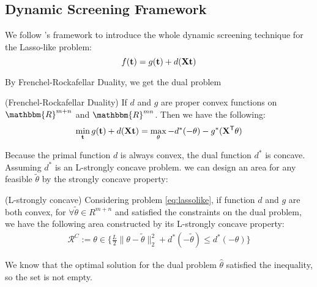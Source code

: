 \subsection{Dynamic Screening Framework}

We follow \citep{NEURIPS2021_7b5b23f4}'s framework to introduce the whole dynamic screening technique for the Lasso-like problem:
\begin{equation}
\label{eq:lassolike}
f(\mathbf t) = g(\mathbf t) + d(\mathbf{X} \mathbf t)
\end{equation}

By Frenchel-Rockafellar Duality, we get the dual problem
\begin{thm}
 (Frenchel-Rockafellar Duality) If $d$ and $g$ are proper convex functions on $\mathbbm{R}^{m+n}$ and $\mathbbm{R}^{mn}$. Then we have the following:
 $$
\begin{aligned}
\min_\mathbf t g(\mathbf t) + d(\mathbf{X}\mathbf t) = \max_{\theta} -d^*(-\theta)-g^*(\mathbf{X}^{\mathsf T}\theta)
\end{aligned}
$$
\end{thm}

Because the primal function $d$ is always convex, the dual function $d^*$ is concave. Assuming $d^*$ is an L-strongly concave problem. we can design an area for any feasible $\tilde{\theta}$ by the strongly concave property:

\begin{thm}\label{circle}
(L-strongly concave) Considering problem \ref{eq:lassolike}, if function $d$ and $g$ are both convex, for $\forall \tilde{\theta} \in{R^{m+n}}$ and satisfied the constraints on the dual problem, we have the following area constructed by its L-strongly concave property:  
$$
\begin{aligned}
\mathcal{R}^{C}:=\theta \in \{\frac{L}{2}\|\theta-\tilde{\theta}\|_2^2+d^*(-\tilde{\theta}) \leq d^*(-\theta)\}
\end{aligned}
$$
\end{thm}
We know that the optimal solution for the dual problem $\hat{\theta}$ satisfied the inequality, so the set is not empty.






